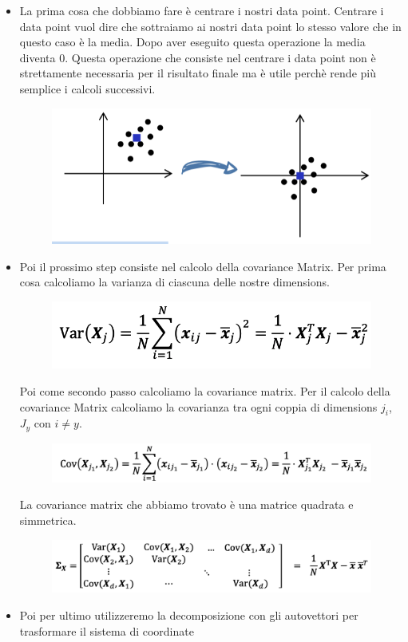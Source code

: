 \documentclass[14pt]{extreport}
\begin{document}
\begin{itemize}
	\item La prima cosa che dobbiamo fare è centrare i nostri data point. Centrare i data point vuol dire che sottraiamo ai nostri data point lo
	      stesso valore che in questo caso è la media. Dopo aver eseguito questa operazione la media diventa 0. Questa operazione che consiste nel
	      centrare i data point non è strettamente necessaria per il risultato finale ma è utile perchè rende più semplice i calcoli successivi.

	      \begin{figure}[H]
		      \centering
		      \includegraphics[width=0.7\linewidth]{444.jpeg}
	      \end{figure}

	\item Poi il prossimo step consiste nel calcolo della covariance Matrix. Per prima cosa calcoliamo la varianza di ciascuna delle nostre
	dimensions.
	      \begin{figure}[H]
		      \centering
		      \includegraphics[width=0.7\linewidth]{445.jpeg}
	      \end{figure}
	      Poi come secondo passo calcoliamo la covariance matrix. Per il calcolo della covariance Matrix calcoliamo la covarianza tra ogni coppia di
	      dimensions $j_i$, $J_y$ con $i \not = y$.
	      \begin{figure}[H]
		      \centering
		      \includegraphics[width=0.7\linewidth]{446.jpeg}
	      \end{figure}
	      La covariance matrix che abbiamo trovato è una matrice quadrata e simmetrica.
	      \begin{figure}[H]
		      \centering
		      \includegraphics[width=0.7\linewidth]{447.jpeg}
	      \end{figure}
	\item Poi per ultimo utilizzeremo la decomposizione con gli autovettori per trasformare il sistema di coordinate
\end{itemize}
\end{document}
